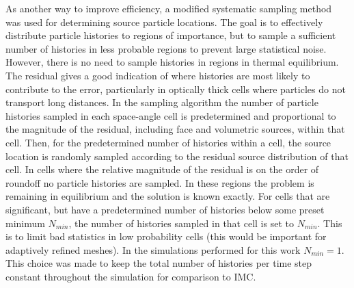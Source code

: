 As another way to improve efficiency, a modified systematic sampling
method~\cite{shultis_mc} was used for determining source particle locations.  The goal is
to effectively distribute particle histories to regions of importance, but to sample a
sufficient number of histories in less probable regions to prevent large statistical
noise.  However, there is no need to sample histories in regions in thermal equilibrium.
The residual gives a good indication of where histories are most likely to contribute to
the error, particularly in optically thick cells where particles do not transport long
distances.   In
the sampling algorithm the number of particle histories sampled in each space-angle cell
is predetermined and proportional to the magnitude of the residual, including face and
volumetric sources, within that cell.  Then, for the predetermined number of histories
within a cell, the source location is randomly sampled according to the residual source
distribution of that cell.  In cells where the relative magnitude of the residual is on the order of roundoff no particle histories are sampled. In these 
regions the problem is remaining in equilibrium and the solution is known exactly.  For
cells that are significant, but have a predetermined number of histories below some preset
minimum $N_{min}$, the number of histories sampled in that cell is set to $N_{min}$. This
is to limit bad statistics in low probability cells (this would be important for
adaptively refined meshes).  In the simulations performed for this work $N_{min}=1$.  This
choice was made to keep the total number of histories per time step constant throughout
the simulation for comparison to IMC. 


